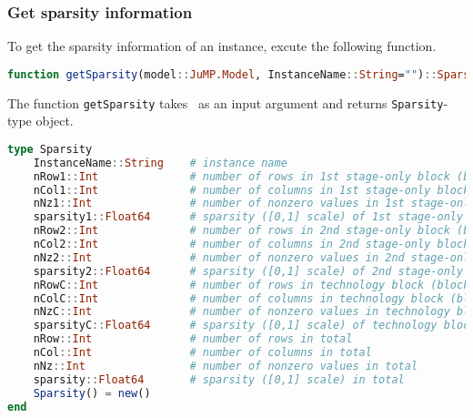 \subsubsection{Get sparsity information}
To get the sparsity information of an instance, excute the following function.
\begin{lstlisting}[frame=single,language=julia]
function getSparsity(model::JuMP.Model, InstanceName::String="")::Sparsity
\end{lstlisting}
The function \texttt{getSparsity} takes \jumpmodel\ as an input argument and returns \texttt{Sparsity}-type object.
\begin{lstlisting}[frame=single,language=julia]
type Sparsity
	InstanceName::String    # instance name
	nRow1::Int              # number of rows in 1st stage-only block (block A)
	nCol1::Int              # number of columns in 1st stage-only block (block A)
	nNz1::Int               # number of nonzero values in 1st stage-only block (block A)
	sparsity1::Float64      # sparsity ([0,1] scale) of 1st stage-only block (block A)
	nRow2::Int              # number of rows in 2nd stage-only block (block W)
	nCol2::Int              # number of columns in 2nd stage-only block (block W)
	nNz2::Int               # number of nonzero values in 2nd stage-only block (block W)
	sparsity2::Float64      # sparsity ([0,1] scale) of 2nd stage-only block (block W)
	nRowC::Int              # number of rows in technology block (block T)
	nColC::Int              # number of columns in technology block (block T)
	nNzC::Int               # number of nonzero values in technology block (block T)  
	sparsityC::Float64      # sparsity ([0,1] scale) of technology block (block T)
	nRow::Int               # number of rows in total
	nCol::Int               # number of columns in total
	nNz::Int                # number of nonzero values in total
	sparsity::Float64       # sparsity ([0,1] scale) in total
	Sparsity() = new()
end
\end{lstlisting}
